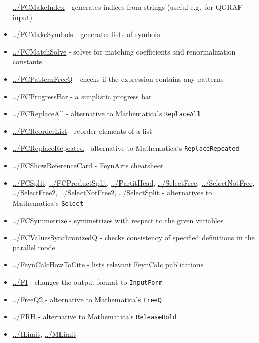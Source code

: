 \documentclass[../FeynCalcManual.tex]{subfiles}
\begin{document}
\begin{itemize}
  \hyperlink{../fcmakeindex}{../FCMakeIndex} - generates indices from
  strings (useful e.g.~for QGRAF input)
\item
  \hyperlink{../fcmakesymbols}{../FCMakeSymbols} - generates lists of
  symbols
\item
  \hyperlink{../fcmatchsolve}{../FCMatchSolve} - solves for matching
  coefficients and renormalization constants
\item
  \hyperlink{../fcpatternfreeq}{../FCPatternFreeQ} - checks if the
  expression contains any patterns
\item
  \hyperlink{../fcprogressbar}{../FCProgressBar} - a simplistic progress
  bar
\item
  \hyperlink{../fcreplaceall}{../FCReplaceAll} - alternative to
  Mathematica's \texttt{ReplaceAll}
\item
  \hyperlink{../fcreorderlist}{../FCReorderList} - reorder elements of a
  list
\item
  \hyperlink{../fcreplacerepeated}{../FCReplaceRepeated} - alternative
  to Mathematica's \texttt{ReplaceRepeated}
\item
  \hyperlink{../fcshowreferencecard}{../FCShowReferenceCard} - FeynArts
  cheatsheet
\item
  \hyperlink{../fcsplit}{../FCSplit},
  \hyperlink{../fcproductsplit}{../FCProductSplit},
  \hyperlink{../partithead}{../PartitHead},
  \hyperlink{../selectfree}{../SelectFree},
  \hyperlink{../selectnotfree}{../SelectNotFree},
  \hyperlink{../selectfree2}{../SelectFree2},
  \hyperlink{../selectnotfree2}{../SelectNotFree2},
  \hyperlink{../selectsplit}{../SelectSplit} - alternatives to
  Mathematica's \texttt{Select}
\item
  \hyperlink{../fcsymmetrize}{../FCSymmetrize} - symmetrizes with
  respect to the given variables
\item
  \hyperlink{../fcvaluessynchronizedq}{../FCValuesSynchronizedQ} -
  checks consistency of specified definitions in the parallel mode
\item
  \hyperlink{../feyncalchowtocite}{../FeynCalcHowToCite} - lists
  relevant FeynCalc publications
\item
  \hyperlink{../fi}{../FI} - changes the output format to
  \texttt{InputForm}
\item
  \hyperlink{../freeq2}{../FreeQ2} - alternative to Mathematica's
  \texttt{FreeQ}
\item
  \hyperlink{../frh}{../FRH} - alternative to Mathematica's
  \texttt{ReleaseHold}
\item
  \hyperlink{../ilimit}{../ILimit}, \hyperlink{../mlimit}{../MLimit} -

\end{itemize}
\end{document}
